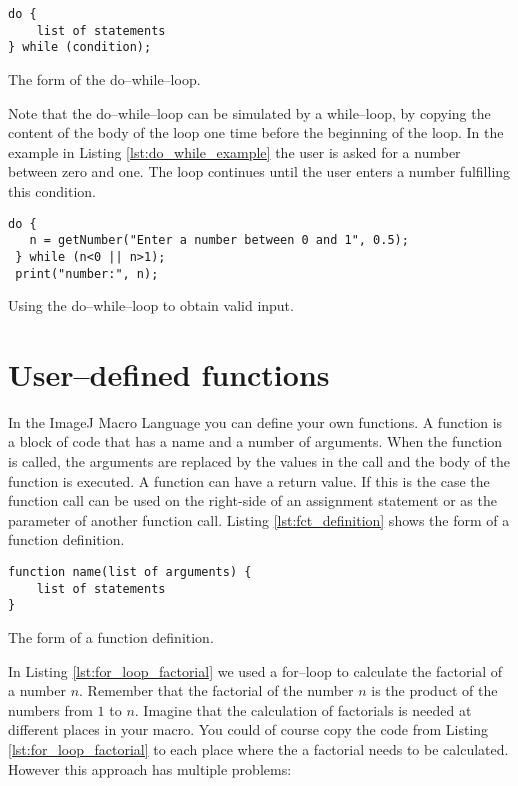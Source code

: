 \begin{listing}[H]
\begin{verbatim}
do {	
	list of statements
} while (condition);
\end{verbatim}
\caption{The form of the do--while--loop.}
\label{lst:do_while_loop}
\end{listing}

Note that the do--while--loop can be simulated by a while--loop, by copying the content of the body of the loop one time before the beginning of the loop. In the example in Listing \ref{lst:do_while_example} the user is asked for a number between zero and one. The loop continues until the user enters a number fulfilling this condition.

\begin{listing}[H]
\begin{verbatim}
do {
   n = getNumber("Enter a number between 0 and 1", 0.5);
 } while (n<0 || n>1);
 print("number:", n);
 \end{verbatim}
\caption{Using the do--while--loop to obtain valid input.}
\label{lst:do_while_example}
\end{listing}

\section{User--defined functions}

In the ImageJ Macro Language you can define your own functions. A function is a block of code that has a name and a number of arguments. When the function is called, the arguments are replaced by the values in the call and the body of the function is executed. A function can have a return value. If this is the case the function call can be used on the right-side of an assignment statement or as the parameter of another function call. Listing \ref{lst:fct_definition} shows the form of a function definition.

\begin{listing}[H]
\begin{verbatim}
function name(list of arguments) {
	list of statements
}
\end{verbatim}
\caption{The form of a function definition.}
\label{lst:fct_definition}
\end{listing}

In Listing \ref{lst:for_loop_factorial} we used a for--loop to calculate the factorial of a number $n$. Remember that the factorial of the number $n$ is the product of the numbers from $1$ to $n$. Imagine that the calculation of factorials is needed at different places in your macro. You could of course copy the code from Listing \ref{lst:for_loop_factorial} to each place where the a factorial needs to be calculated. However this approach has multiple problems:

